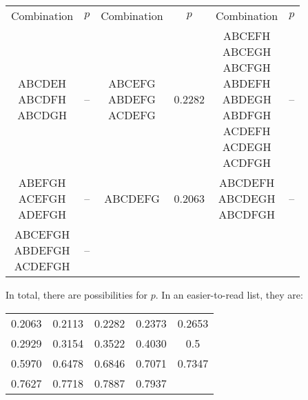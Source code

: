 \documentclass{article}
\begin{document}
\vspace{0.2in}
\begin{center}
\begin{tabular*}{0.9\textwidth}{@{\extracolsep{\fill}}cccccc}
Combination & $p$ & Combination & $p$ & Combination & $p$ \\
\cline{1-2} \cline{3-4} \cline{5-6}
\makecell{ABCDEH\\ABCDFH\\ABCDGH} & -- & \makecell{ABCEFG\\ABDEFG\\ACDEFG} & 0.2282 &
\makecell{ABCEFH\\ABCEGH\\ABCFGH\\ABDEFH\\ABDEGH\\ABDFGH\\ACDEFH\\ACDEGH\\ACDFGH} & -- \\
\cline{1-2} \cline{3-4} \cline{5-6}
\makecell{ABEFGH\\ACEFGH\\ADEFGH} & -- & ABCDEFG & 0.2063 & \makecell{ABCDEFH\\ABCDEGH\\ABCDFGH} & -- \\
\cline{1-2} \cline{3-4} \cline{5-6}
\makecell{ABCEFGH\\ABDEFGH\\ACDEFGH} & --
\end{tabular*}
\end{center}

In total, there are
 possibilities for $p$.
In an easier-to-read list, they are:

\vspace{0.2in}
\begin{center}
\begin{tabular*}{0.55\textwidth}{@{\extracolsep{\fill}}ccccc}
0.2063 & 0.2113 & 0.2282 & 0.2373 & 0.2653 \\
0.2929 & 0.3154 & 0.3522 & 0.4030 & 0.5 \\
0.5970 & 0.6478 & 0.6846 & 0.7071 & 0.7347 \\
0.7627 & 0.7718 & 0.7887 & 0.7937
\end{tabular*}
\end{center}
\end{document}
